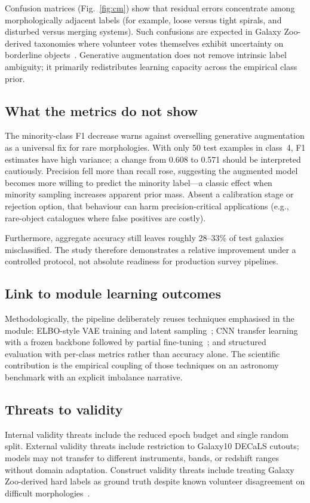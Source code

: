 \documentclass[conference]{IEEEtran}
\begin{document}
Confusion matrices (Fig.~\ref{fig:cm}) show that residual errors concentrate among morphologically adjacent labels (for example, loose versus tight spirals, and disturbed versus merging systems). Such confusions are expected in Galaxy Zoo-derived taxonomies where volunteer votes themselves exhibit uncertainty on borderline objects~\cite{willett2013galaxy,walmsley2022galaxy}. Generative augmentation does not remove intrinsic label ambiguity; it primarily redistributes learning capacity across the empirical class prior.

\subsection{What the metrics do not show}
The minority-class F1 decrease warns against overselling generative augmentation as a universal fix for rare morphologies. With only 50 test examples in class~4, F1 estimates have high variance; a change from 0.608 to 0.571 should be interpreted cautiously. Precision fell more than recall rose, suggesting the augmented model becomes more willing to predict the minority label---a classic effect when minority sampling increases apparent prior mass. Absent a calibration stage or rejection option, that behaviour can harm precision-critical applications (e.g., rare-object catalogues where false positives are costly).

Furthermore, aggregate accuracy still leaves roughly 28--33\% of test galaxies misclassified. The study therefore demonstrates a relative improvement under a controlled protocol, not absolute readiness for production survey pipelines.

\subsection{Link to module learning outcomes}
Methodologically, the pipeline deliberately reuses techniques emphasised in the module: ELBO-style VAE training and latent sampling~\cite{kingma2014auto,zhang2023dive,aggarwal2018neural}; CNN transfer learning with a frozen backbone followed by partial fine-tuning~\cite{he2016deep,hope2017tensorflow}; and structured evaluation with per-class metrics rather than accuracy alone. The scientific contribution is the empirical coupling of those techniques on an astronomy benchmark with an explicit imbalance narrative.

\subsection{Threats to validity}
Internal validity threats include the reduced epoch budget and single random split. External validity threats include restriction to Galaxy10 DECaLS cutouts; models may not transfer to different instruments, bands, or redshift ranges without domain adaptation. Construct validity threats include treating Galaxy Zoo-derived hard labels as ground truth despite known volunteer disagreement on difficult morphologies~\cite{lintott2008galaxy}.
\end{document}
